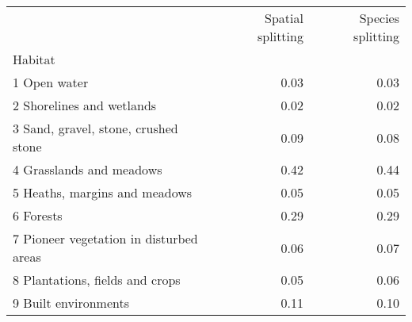 \begin{tabular}{lrr}
\toprule
{} &  Spatial splitting &  Species splitting \\
Habitat                                 &                    &                    \\
\midrule
1 Open water                            &               0.03 &               0.03 \\
2 Shorelines and wetlands               &               0.02 &               0.02 \\
3 Sand, gravel, stone, crushed stone    &               0.09 &               0.08 \\
4 Grasslands and meadows                &               0.42 &               0.44 \\
5 Heaths, margins and meadows           &               0.05 &               0.05 \\
6 Forests                               &               0.29 &               0.29 \\
7 Pioneer vegetation in disturbed areas &               0.06 &               0.07 \\
8 Plantations, fields and crops         &               0.05 &               0.06 \\
9 Built environments                    &               0.11 &               0.10 \\
\bottomrule
\end{tabular}

